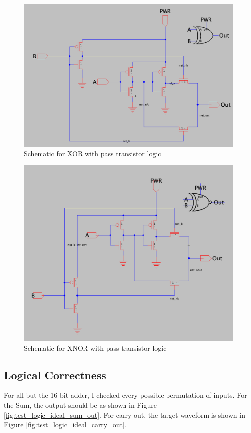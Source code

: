 \documentclass{article}
\begin{document}
\begin{figure}[H]
  \includegraphics[width=\linewidth]{opt_screenshots/pass_xor_sch.png}
  \caption{Schematic for XOR with pass transistor logic}
  \label{fig:pass_xor_sch}
\end{figure}

\begin{figure}[H]
  \includegraphics[width=\linewidth]{opt_screenshots/pass_xnor_sch.png}
  \caption{Schematic for XNOR with pass transistor logic}
  \label{fig:pass_xnor_sch}
\end{figure}

\subsection{Logical Correctness}
For all but the 16-bit adder, I checked every possible permutation of inputs. For the Sum, the output should be as shown in Figure \ref{fig:test_logic_ideal_sum_out}. For carry out, the target waveform is shown in Figure \ref{fig:test_logic_ideal_carry_out}.
\end{document}
